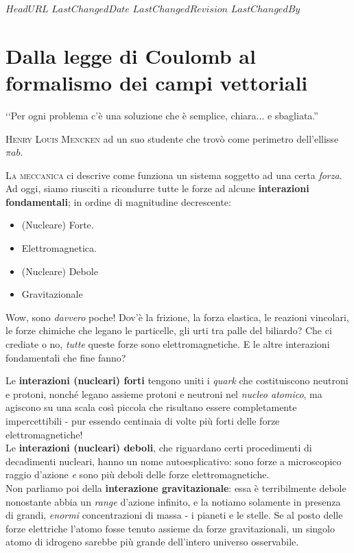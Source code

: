 \svnidlong
{$HeadURL$}
{$LastChangedDate$}
{$LastChangedRevision$}
{$LastChangedBy$}

\chapter{Dalla legge di Coulomb al formalismo dei campi vettoriali}

\begin{introduction}
‘‘Per ogni problema c'è una soluzione che è semplice, chiara... e sbagliata.''
\begin{flushright}
	\textsc{Henry Louis Mencken} ad un suo studente che trovò come perimetro dell'ellisse $\pi ab$. %
\end{flushright}
\end{introduction}
\lettrine[findent=1pt, nindent=0pt]{L}{a meccanica} ci descrive come funziona un sistema soggetto ad una certa \textit{forza}. Ad oggi, siamo riusciti a ricondurre tutte le forze ad alcune \textbf{interazioni fondamentali}; in ordine di magnitudine decrescente:
 \begin{itemize}
 	\item (Nucleare) Forte.
 	\item Elettromagnetica.
 	\item (Nucleare) Debole
 	\item Gravitazionale
 \end{itemize}
 Wow, sono \textit{davvero} poche! Dov'è la frizione, la forza elastica, le reazioni vincolari, le forze chimiche che legano le particelle, gli urti tra palle del biliardo? Che ci crediate o no, \textit{tutte} queste forze sono elettromagnetiche. E le altre interazioni fondamentali che fine fanno?

Le \textbf{interazioni (nucleari) forti} tengono uniti i \textit{quark} che costituiscono neutroni e protoni, nonché legano assieme protoni e neutroni nel \textit{nucleo atomico}, ma agiscono su una scala così piccola che risultano essere completamente impercettibili - pur essendo centinaia di volte più forti delle forze elettromagnetiche!\\
Le \textbf{interazioni (nucleari) deboli}, che riguardano certi procedimenti di decadimenti nucleari, hanno un nome autoesplicativo: sono forze a microscopico raggio d'azione \textit{e} sono più deboli delle forze elettromagnetiche.\\
Non parliamo poi della \textbf{interazione gravitazionale}: essa è terribilmente debole nonostante abbia un \textit{range} d'azione infinito, e la notiamo solamente in presenza di grandi, \textit{enormi} concentrazioni di massa - i pianeti e le stelle. Se al posto delle forze elettriche l'atomo fosse tenuto assieme da forze gravitazionali, un singolo atomo di idrogeno sarebbe più grande dell'intero universo osservabile.

